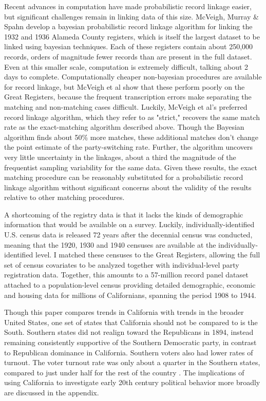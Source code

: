 \documentclass[11pt]{scrartcl}\usepackage[]{graphicx}\usepackage[]{color}
\begin{document}
Recent advances in computation have made probabilistic record linkage easier, but significant challenges remain in linking data of this size.  McVeigh, Murray \& Spahn \citeyearpar{mcveigh2018scaling} develop a bayesian probabilistic record linkage algorithm for linking the 1932 and 1936 Alameda County registers, which is itself the largest dataset to be linked using bayesian techniques. Each of these registers contain about 250,000 records, orders of magnitude fewer records than are present in the full dataset. Even at this smaller scale, computation is extremely difficult, talking about 2 days to complete. Computationally cheaper non-bayesian procedures are available for record linkage, but McVeigh et al show that these perform poorly on the Great Registers, because the frequent transcription errors make separating the matching and non-matching cases difficult. Luckily, McVeigh et al's preferred record linkage algorithm, which they refer to as "strict," recovers the same match rate as the exact-matching algorithm described above. Though the Bayesian algorithm finds about 50\% more matches, these additional matches don't change the point estimate of the party-switching rate. Further, the algorithm uncovers very little uncertainty in the linkages, about a third the magnitude of the frequentist sampling variability  for the same data. Given these results, the exact matching procedure can be reasonably substituted for a probabilistic record linkage algorithm without significant concerns about the validity of the results relative to other matching procedures.


A shortcoming of the registry data is that it lacks the kinds of demographic information that would be available on a survey.  Luckily, individually-identified U.S. census data is released 72 years after the decennial census was conducted, meaning that the 1920, 1930 and 1940 censuses are available at the individually-identified level.  I matched these censuses to the Great Registers, allowing the full set of census covariates to be analyzed together with individual-level party registration data. Together, this amounts to a 57-million record panel dataset attached to a population-level census providing detailed demographic, economic and housing data for millions of Californians, spanning the period 1908 to 1944.

Though this paper compares trends in California with trends in the broader United States, one set of states that California should not be compared to is the South. Southern states did not realign toward the Republicans in 1894, instead remaining consistently supportive of the Southern Democratic party, in contrast to Republican dominance in California. Southern voters also had lower rates of turnout. The voter turnout rate was only about a quarter in the Southern states, compared to just under half for the rest of the country \citep{burnham1965changing}. The implications of using California to investigate early 20th century political behavior more broadly are discussed in the appendix.
\end{document}
